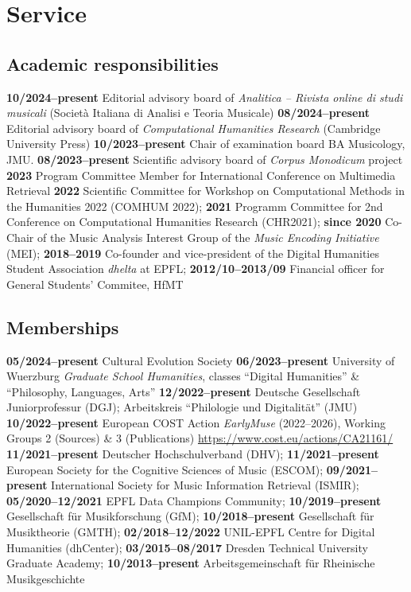 \section{Service}

\subsection{Academic responsibilities}

\textbf{10/2024--present} Editorial advisory board of \emph{Analitica -- Rivista online di studi musicali} (Società Italiana di Analisi e Teoria Musicale)
\textbf{08/2024--present} Editorial advisory board of \emph{Computational Humanities Research} (Cambridge University Press)
\textbf{10/2023--present} Chair of examination board BA Musicology, JMU. 
\textbf{08/2023--present} Scientific advisory board of \textit{Corpus Monodicum} project
\textbf{2023} Program Committee Member for International Conference on Multimedia
Retrieval
\textbf{2022} Scientific Committee for Workshop on Computational Methods in the Humanities 2022 (COMHUM 2022);
\textbf{2021} Programm Committee for 2nd Conference on Computational Humanities Research (CHR2021);
\textbf{since 2020} Co-Chair of the Music Analysis Interest Group of the \emph{Music Encoding Initiative} (MEI);
\textbf{2018--2019} Co-founder and vice-president of the Digital Humanities Student Association \emph{dhelta} at EPFL;
\textbf{2012/10--2013/09} Financial officer for General Students' Commitee, HfMT

\subsection{Memberships}

\textbf{05/2024--present} Cultural Evolution Society
\textbf{06/2023--present} University of Wuerzburg \emph{Graduate School Humanities}, classes ``Digital Humanities'' \& ``Philosophy, Languages, Arts''
\textbf{12/2022--present} Deutsche Gesellschaft Juniorprofessur (DGJ); Arbeitskreis ``Philologie und Digitalität'' (JMU)
\textbf{10/2022--present} European COST Action \emph{EarlyMuse} (2022--2026), Working Groups 2 (Sources) \& 3 (Publications) \url{https://www.cost.eu/actions/CA21161/}
\textbf{11/2021--present} Deutscher Hochschulverband (DHV);
\textbf{11/2021--present} European Society for the Cognitive Sciences of Music (ESCOM);
\textbf{09/2021--present} International Society for Music Information Retrieval (ISMIR);
\textbf{05/2020--12/2021} EPFL Data Champions Community;
\textbf{10/2019--present} Gesellschaft f{\"u}r Musikforschung (GfM);
\textbf{10/2018--present} Gesellschaft f{\"u}r Musiktheorie (GMTH);
\textbf{02/2018--12/2022} UNIL-EPFL Centre for Digital Humanities (dhCenter);
\textbf{03/2015--08/2017} Dresden Technical University Graduate Academy;
\textbf{10/2013--present} Arbeitsgemeinschaft für Rheinische Musikgeschichte

